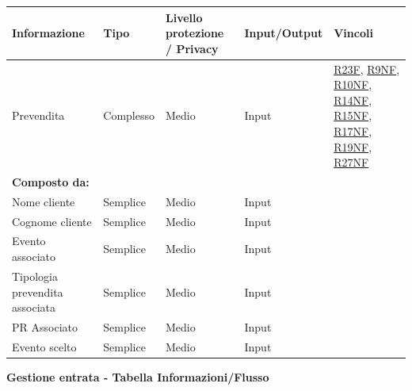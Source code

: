\documentclass[a4paper]{article}
\begin{document}
\begin{center}
    \begin{tabularx}{1\textwidth}{|X|l|X|X|X|}
        \hline
        \textbf{Informazione} &\textbf{Tipo} & \textbf{Livello protezione / Privacy} & \textbf{Input/Output} & \textbf{Vincoli}\\
        \hline
        \hline
        Prevendita & Complesso & Medio & Input & \hyperlink{R23F}{R23F}, \hyperlink{R9NF}{R9NF}, \hyperlink{R10NF}{R10NF}, \hyperlink{R14NF}{R14NF}, \hyperlink{R15NF}{R15NF}, \hyperlink{R17NF}{R17NF}, \hyperlink{R19NF}{R19NF}, \hyperlink{R27NF}{R27NF} \\
        \textbf{Composto da:} & & & & \\
        Nome cliente & Semplice & Medio & Input & \\
        Cognome cliente & Semplice & Medio & Input & \\
        Evento associato & Semplice & Medio & Input & \\
        Tipologia prevendita associata & Semplice & Medio & Input & \\
        PR Associato & Semplice & Medio & Input & \\
        \hline
        Evento scelto & Semplice & Medio & Input & \\
        \hline
    \end{tabularx}
\end{center}

\textbf{Gestione entrata  - Tabella Informazioni/Flusso}
\end{document}
